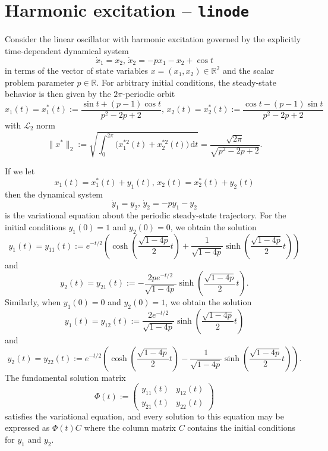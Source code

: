 \section{Harmonic excitation -- \texttt{linode}}
Consider the linear oscillator with harmonic excitation governed by the explicitly time-dependent dynamical system
\begin{equation}
\dot{x}_1=x_2,\,\dot{x}_2=-px_1-x_2+\cos t
\end{equation}
in terms of the vector of state variables $x=\left(x_1,x_2\right)\in\mathbb{R}^2$ and the scalar problem parameter $p\in\mathbb{R}$. For arbitrary initial conditions, the steady-state behavior is then given by the $2\pi$-periodic orbit
\begin{equation}
x_1(t)=x_1^\ast(t):=\frac{\sin t+(p-1)\cos t}{p^2-2p+2},\,x_2(t)=x_2^\ast(t):=\frac{\cos t-(p-1)\sin t}{p^2-2p+2}
\end{equation}
with $\mathcal{L}_2$ norm 
\begin{equation}
\|x^\ast\|_2:=\sqrt{\int_0^{2\pi}\big(x_1^{\ast2}(t)+x_2^{\ast2}(t)\big)\,\mathrm{d}t}=\frac{\sqrt{2\pi}}{\sqrt{p^2-2p+2}}.
\end{equation}

If we let 
\begin{equation}
x_1(t)=x_1^\ast(t)+y_1(t),\,x_2(t)=x_2^\ast(t)+y_2(t)
\end{equation}
then the dynamical system
\begin{equation}
\dot{y}_1=y_2,\,\dot{y}_2=-py_1-y_2
\end{equation}
is the variational equation about the periodic steady-state trajectory. For the initial conditions $y_1(0)=1$ and $y_2(0)=0$, we obtain the solution
\begin{equation}
y_1(t)=y_{11}(t):=e^{-t/2}\left(\cosh\left(\frac{\sqrt{1-4p}}{2}t\right)+\frac{1}{\sqrt{1-4p}}\sinh\left(\frac{\sqrt{1-4p}}{2}t\right)\right)
\end{equation}
and
\begin{equation}
y_2(t)=y_{21}(t):=-\frac{2pe^{-t/2}}{\sqrt{1-4p}}\sinh\left(\frac{\sqrt{1-4p}}{2}t\right).
\end{equation}
Similarly, when $y_1(0)=0$ and $y_2(0)=1$, we obtain the solution
\begin{equation}
y_1(t)=y_{12}(t):=\frac{2e^{-t/2}}{\sqrt{1-4p}}\sinh\left(\frac{\sqrt{1-4p}}{2}t\right)
\end{equation}
and
\begin{equation}
y_2(t)=y_{22}(t):=e^{-t/2}\left(\cosh\left(\frac{\sqrt{1-4p}}{2}t\right)-\frac{1}{\sqrt{1-4p}}\sinh\left(\frac{\sqrt{1-4p}}{2}t\right)\right).
\end{equation}
The fundamental solution matrix
\begin{equation}
\Phi(t):=\left(\begin{array}{cc}y_{11}(t) & y_{12}(t)\\y_{21}(t) & y_{22}(t)\end{array}\right)
\end{equation}
satisfies the variational equation, and every solution to this equation may be expressed as $\Phi(t)C$ where the column matrix $C$ contains the initial conditions for $y_1$ and $y_2$.

